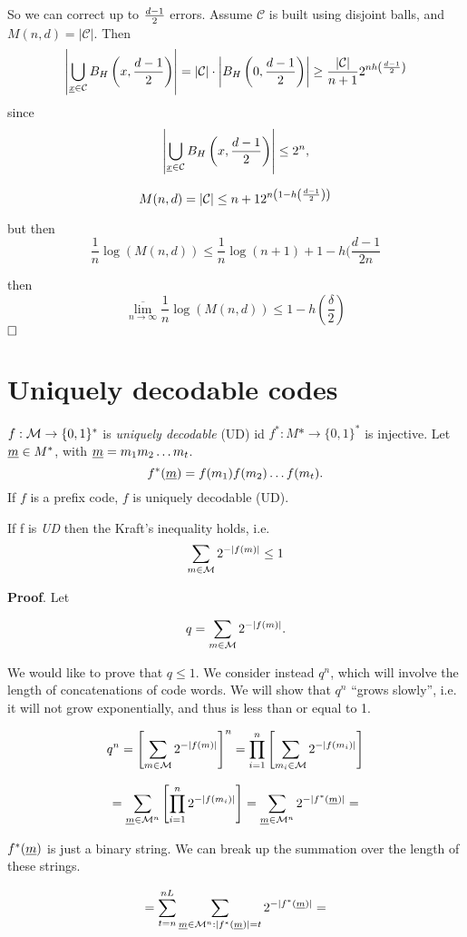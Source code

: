 So we can correct up to $\frac{d-1}{2}$ errors. Assume $\mathcal{C}$ is built using disjoint balls, and $M(n, d) = |\mathcal{C}|$. Then
\[
\left|\bigcup_{\underline{x}\in\mathcal{C}}B_H\left(x, \dfrac{d-1}{2}\right)\right| = |\mathcal{C}|\cdot \left|B_H\left(0, \dfrac{d-1}{2}\right)\right| \geq \dfrac{|\mathcal{C}|}{n+1}2^{nh\left(\frac{d-1}{2}\right)}
\]
since 
\[
 \left|\bigcup_{\underline{x}\in\mathcal{C}}B_H\left(x, \dfrac{d-1}{2}\right)\right| \leq 2^n,
\]

\[
 M(n, d) = |\mathcal{C}| \leq n+1 2^{n\left(1-h\left(\frac{d-1}{2}\right)\right)}
\]

but then
\[
 \dfrac{1}{n} \log(M(n, d)) \leq \dfrac{1}{n}\log(n+1) + 1 -h(\dfrac{d-1}{2n}
\]

then
\[
 \overline{\lim_{n\rightarrow \infty}}\dfrac{1}{n}\log(M(n, d)) \leq 1 - h\left(\dfrac{\delta}{2}\right)
\]
$\hfill\Box$

\section{Uniquely decodable codes}
$f:\mathcal{M} \rightarrow \{0, 1\}^*$ is \emph{uniquely decodable} (UD) id $f^*:M*\rightarrow \{0,1\}^*$ is injective. Let $\underline{m} \in M^*$, with $\underline{m} = m_1m_2\ldots m_t$.
\[
 f^*(\underline{m}) = f(m_1)f(m_2)\ldots f(m_t).
\]
If $f$ is a prefix code, $f$ is uniquely decodable (UD).

\begin{thm}
If f is \emph{UD} then the Kraft's inequality holds, i.e.
\[
 \sum_{m \in \mathcal{M}} 2^{-|f(m)|} \leq 1
\]
\end{thm}
\noindent\textbf{Proof}. Let

\[
 q = \sum_{m \in \mathcal{M}} 2^{-|f(m)|}.
\]

We would like to prove that $q \leq 1$. We consider instead $q^n$, which will involve the length of concatenations of code words. We will show that $q^n$ ``grows slowly'', i.e. it will not grow exponentially, and thus is less than or equal to 1. 

\[
 q^n = \left[\sum_{m \in \mathcal{M}} 2^{-|f(m)|}\right]^n = \prod_{i=1}^n \left[ \sum_{m_i \in \mathcal{M}} 2^{-|f(m_i)|} \right]
\]

\[
 = \sum_{\underline{m} \in \mathcal{M}^n}\left[\prod_{i=1}^n 2^{-|f(m_i)|}\right] = \sum_{\underline{m} \in \mathcal{M}^n} 2^{-|f^*(\underline{m})|} =
\]

$f^*(\underline{m})$ is just a binary string. We can break up the summation over the length of these strings.

\[
 = \sum_{t = n}^{nL}\sum_{\underline{m} \in \mathcal{M}^n:|f^*(\underline{m})| = t} 2^{-|f^*(\underline{m})|} =
\]

